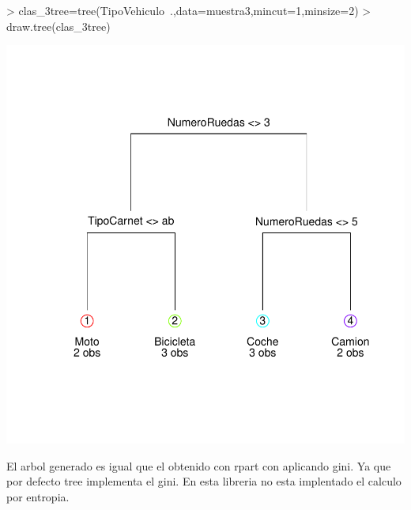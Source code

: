 \documentclass [a4paper] {article}
\begin{document}
\begin{center}
\begin{Schunk}
\begin{Sinput}
> clas_3tree=tree(TipoVehiculo~.,data=muestra3,mincut=1,minsize=2) 
> draw.tree(clas_3tree)
\end{Sinput}
\end{Schunk}
\includegraphics{entrega2-tree_tree}
\end{center}

El arbol generado es igual que el obtenido con rpart con aplicando gini.
Ya que por defecto tree implementa el gini.
En esta libreria no esta implentado el calculo por entropia.
\end{document}
